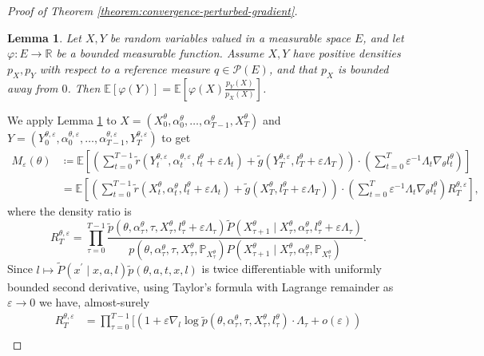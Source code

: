 \documentclass[11pt]{article}
\numberwithin{equation}{section}
\newtheorem{lemma}[theorem]{Lemma}
\theoremstyle{definition}
\theoremstyle{remark}
\def\eps{\varepsilon}
\def\R{{\mathbb R}}
\begin{document}
\begin{proof}[Proof of Theorem \ref{theorem:convergence-perturbed-gradient}]
\begin{lemma}
    \label{lemma:density-ratio-trick}
    Let $X,Y$ be random variables valued in a measurable space $E$, and let $\varphi: E \to \R$ be a bounded measurable function. Assume $X,Y$ have positive densities $p_X,p_Y$ with respect to a reference measure $q \in \mathcal P (E)$, and that $p_X$ is bounded away from $0$. Then $\mathbb E [\varphi(Y)] = \mathbb E \left[\varphi(X) \frac{p_Y(X)}{p_X(X)}\right]$.
\end{lemma}
We apply Lemma \ref{lemma:density-ratio-trick} to $X = \left(X_0^\theta, \alpha_0^\theta, \ldots, \alpha_{T-1}^\theta, X_{T}^\theta\right)$ and $Y = \left(Y_0^{\theta, \eps}, \alpha_0^{\theta, \eps}, \ldots, \alpha_{T-1}^{\theta, \eps}, Y_T^{\theta, \eps} \right)$ to get
\[
\begin{aligned}
    M_{\eps}(\theta) & \coloneq \mathbb E \left[\left( \sum_{t = 0}^{T - 1} \tilde r(Y^{\theta,\eps}_t,  \alpha_t^{\theta,\eps},  l_t^\theta + \eps \Lambda_t) + \tilde g(Y_T^{\theta, \eps}, l_T^\theta + \eps \Lambda_T) \right) 
    \cdot \left( \sum_{t = 0}^{T} \eps^{-1} \Lambda_t \nabla_{\theta} l_t^\theta \right)\right] \\
    &= \mathbb E \left[\left( \sum_{t = 0}^{T - 1} \tilde r(X_t^\theta,  \alpha_t^{\theta},  l_t^\theta + \eps \Lambda_t) + \tilde g(X_T^{\theta}, l^{\theta}_T + \eps \Lambda_T) \right) 
    \cdot \left( \sum_{t = 0}^{T} \eps^{-1} \Lambda_t \nabla_{\theta} l_t^\theta \right) R_{T}^{\theta, \eps}\right],
\end{aligned}
\]
where the density ratio is
\begin{equation}
    \label{eq:likelihood-ratio-T}
R_{T}^{\theta, \eps} = 
\prod_{\tau = 0}^{T-1} 
\frac{\tilde p(\theta, \alpha_\tau^\theta,\tau,X_\tau^\theta, l_\tau^\theta + \eps \Lambda_{\tau})
\tilde P(X_{\tau + 1}^\theta \mid X_{\tau}^\theta,\alpha_{\tau}^\theta, l_\tau^\theta + \eps \Lambda_\tau)}
{p(\theta, \alpha_\tau^\theta, \tau,X_{\tau}^{\theta}, \mathbb P_{X_{\tau}^\theta}) P (X_{\tau + 1}^\theta \mid X_{\tau}^\theta, \alpha_\tau^\theta,\mathbb P_{X_\tau^{\theta}})}.
\end{equation}
Since $l \mapsto \tilde P (x^\prime \mid x, a, l) \tilde p(\theta, a , t,x, l)$ is twice differentiable with uniformly bounded second derivative,
using Taylor's formula with Lagrange remainder as $\eps \to 0$ we have, almost-surely
\[
\begin{aligned}
R_T^{\theta,\eps} &= \prod_{\tau = 0}^{T-1} \Big[\left(1 + \eps \nabla_{l} \log \tilde p(\theta, \alpha_\tau^\theta,\tau,X_\tau^{\theta}, l_\tau^\theta ) \cdot \Lambda_\tau + o(\eps)\right) \\

\end{aligned}\]
\end{proof}
\end{document}
